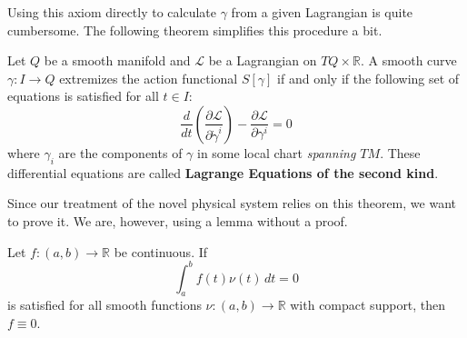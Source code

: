 Using this axiom directly to calculate $\gamma$ from a given Lagrangian is quite cumbersome. The following theorem simplifies this procedure a bit.
\begin{theorem}
    Let $Q$ be a smooth manifold and $\mathcal{L}$ be a Lagrangian on $TQ \times \mathbb{R}$. A smooth curve $\gamma: I \to Q$ extremizes the action functional $S[\gamma]$ if and only if the following set of equations is satisfied for all $t \in I$:
    \begin{equation}
        \frac{d}{dt} \left( \frac{\partial \mathcal{L}}{\partial \dot{\gamma}^i} \right) - \frac{\partial \mathcal{L}}{\partial \gamma^i} = 0
    \end{equation}
    where $\gamma_i$ are the components of $\gamma$ in some local chart \emph{spanning $TM$}. These differential equations are called \textbf{Lagrange Equations of the second kind}.
\end{theorem}
Since our treatment of the novel physical system relies on this theorem, we want to prove it. We are, however, using a lemma without a proof.
\begin{lemma}
    Let $f: (a,b) \to \mathbb{R}$ be continuous. If 
    \[
        \int_a^b f(t) \nu (t) \, dt = 0
    \] is satisfied for all smooth functions $\nu: (a,b) \to \mathbb{R}$ with compact support, then $f \equiv 0$. 
\end{lemma}
